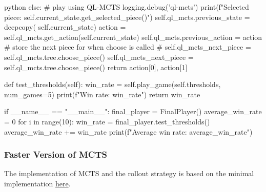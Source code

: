 \begin{mintedbox}{python}
            else:
                # play using QL-MCTS
                logging.debug('ql-mcts')
                print(f"Selected piece: {self.current_state.get_selected_piece()}")
                self.ql_mcts.previous_state = deepcopy(
                    self.current_state)
                action = self.ql_mcts.get_action(self.current_state)
                self.ql_mcts.previous_action = action
                # store the next piece for when choose is called
                # self.ql_mcts_next_piece = self.ql_mcts.tree.choose_piece()
                self.ql_mcts_next_piece = self.ql_mcts.tree.choose_piece()
                return action[0], action[1]

    def test_thresholds(self):
        win_rate = self.play_game(self.thresholds, num_games=5)
        print(f"Win rate: {win_rate}")
        return win_rate

if __name__ == "__main__":
    final_player = FinalPlayer()
    average_win_rate = 0
    for i in range(10):
        win_rate = final_player.test_thresholds()
        average_win_rate += win_rate
    print(f"Average win rate: {average_win_rate}")
\end{mintedbox}

\subsubsection{Faster Version of MCTS}

The implementation of MCTS and the rollout strategy is based on the minimal implementation \href{https://gist.github.com/qpwo/c538c6f73727e254fdc7fab81024f6e1}{here}.

